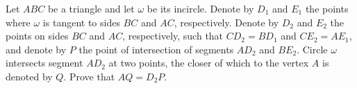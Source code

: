 Let $ABC$ be a triangle and let $\omega$ be its incircle. Denote by $D_1$ and $E_1$ the points where $\omega$ is tangent to sides $BC$ and $AC$,  respectively. Denote by $D_2$ and $E_2$ the points on sides $BC$ and $AC$,  respectively, such that $CD_2=BD_1$ and $CE_2=AE_1$,  and denote by $P$ the point of intersection of segments $AD_2$ and $BE_2$. Circle $\omega$ intersects segment $AD_2$ at two points, the closer of which to the vertex $A$ is denoted by $Q$. Prove that $AQ=D_2P$.